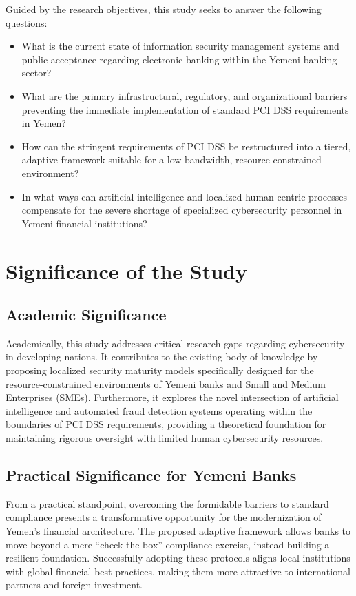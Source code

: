 \documentclass[12pt,a4paper,oneside]{report}
\begin{document}
	Guided by the research objectives, this study seeks to answer the following questions:
	\begin{itemize}
		\item What is the current state of information security management systems and public acceptance regarding electronic banking within the Yemeni banking sector?
		\item What are the primary infrastructural, regulatory, and organizational barriers preventing the immediate implementation of standard PCI DSS requirements in Yemen?
		\item How can the stringent requirements of PCI DSS be restructured into a tiered, adaptive framework suitable for a low-bandwidth, resource-constrained environment?
		\item In what ways can artificial intelligence and localized human-centric processes compensate for the severe shortage of specialized cybersecurity personnel in Yemeni financial institutions?
	\end{itemize}
	
	\section{Significance of the Study}
	
	\subsection{Academic Significance}
	Academically, this study addresses critical research gaps regarding cybersecurity in developing nations. It contributes to the existing body of knowledge by proposing localized security maturity models specifically designed for the resource-constrained environments of Yemeni banks and Small and Medium Enterprises (SMEs). Furthermore, it explores the novel intersection of artificial intelligence and automated fraud detection systems operating within the boundaries of PCI DSS requirements, providing a theoretical foundation for maintaining rigorous oversight with limited human cybersecurity resources.
	
	\subsection{Practical Significance for Yemeni Banks}
	From a practical standpoint, overcoming the formidable barriers to standard compliance presents a transformative opportunity for the modernization of Yemen's financial architecture. The proposed adaptive framework allows banks to move beyond a mere ``check-the-box'' compliance exercise, instead building a resilient foundation. Successfully adopting these protocols aligns local institutions with global financial best practices, making them more attractive to international partners and foreign investment. 
	
\end{document}
